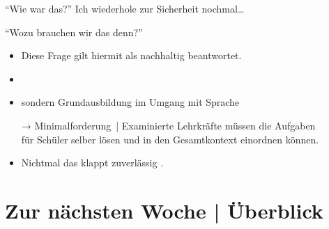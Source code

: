\begin{frame}
  {"`Wie war das?"'}
  \onslide<+->
  \onslide<+->
  Ich wiederhole zur Sicherheit nochmal\ldots\\
  \Zeile
  \onslide<+->
  \begin{center}
    \Large{}
  \end{center}
\end{frame}

\begin{frame}
  {"`Wozu brauchen wir das denn?"'}
  \onslide<+->
  \begin{itemize}[<+->]
    \item Diese Frage gilt hiermit als nachhaltig beantwortet.
      \Zeile
    \item {}
    \item sondern Grundausbildung im \alert{Umgang mit Sprache} 
      \Zeile
    \item[→] Minimalforderung | \alert{Examinierte Lehrkräfte müssen die Aufgaben\\
         für Schüler selber lösen und in den Gesamtkontext einordnen können.}
    \item Nichtmal das klappt zuverlässig \citep{SchaeferSayatz2017a}.
  \end{itemize}
\end{frame}


\ifdefined\TITLE
  \section{Zur nächsten Woche | Überblick}

